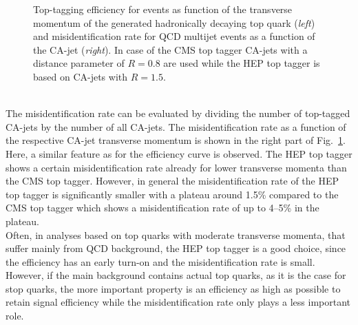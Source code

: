\begin{description}
\begin{figure}[!t]
{\begin{tabular}{cc}
  \end{tabular}}
  \caption{Top-tagging efficiency for \ttbar events as function of the transverse momentum of the generated hadronically decaying top quark (\textit{left}) and misidentification rate for QCD multijet events as a function of the CA-jet \pt (\textit{right}). In case of the CMS top tagger CA-jets with a distance parameter of $R=0.8$ are used while the HEP top tagger is based on CA-jets with $R=1.5$.}
  \label{fig:stop_top_eff}
\end{figure} 
\\
The misidentification rate can be evaluated by dividing the number of top-tagged CA-jets by the number of all CA-jets. The misidentification rate as a function of the respective CA-jet transverse momentum is shown in the right part of Fig.~\ref{fig:stop_top_eff}. Here, a similar feature as for the efficiency curve is observed. The HEP top tagger shows a certain misidentification rate already for lower transverse momenta than the CMS top tagger. However, in general the misidentification rate of the HEP top tagger is significantly smaller with a plateau around 1.5\% compared to the CMS top tagger which shows a misidentification rate of up to 4--5\% in the plateau. \\
Often, in analyses based on top quarks with moderate transverse momenta, that suffer mainly from QCD background, the HEP top tagger is a good choice, since the efficiency has an early turn-on and the misidentification rate is small. However, if the main background contains actual top quarks, as it is the case for stop quarks, the more important property is an efficiency as high as possible to retain signal efficiency while the misidentification rate only plays a less important role. 
\end{description}
